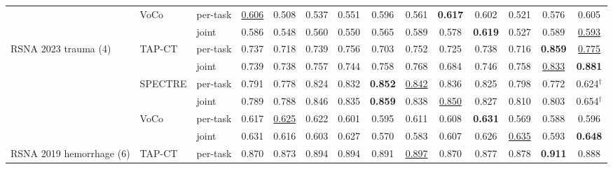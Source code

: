 \begin{tabular}{@{}lllccccccccccc@{}}
\addlinespace[1.5pt]
 & VoCo & per-task & \cellcolor{modebest}\underline{0.606} & 0.508 & 0.537 & \cellcolor{modebest}0.551 & \cellcolor{modebest}0.596 & 0.561 & \cellcolor{modebest}\textbf{0.617} & 0.602 & 0.521 & 0.576 & \cellcolor{modebest}0.605 \\
 &  & joint & 0.586 & \cellcolor{modebest}0.548 & \cellcolor{modebest}0.560 & 0.550 & 0.565 & \cellcolor{modebest}0.589 & 0.578 & \cellcolor{modebest}\textbf{0.619} & \cellcolor{modebest}0.527 & \cellcolor{modebest}0.589 & \underline{0.593} \\
\addlinespace
RSNA 2023 trauma (4) & TAP-CT & per-task & 0.737 & 0.718 & 0.739 & \cellcolor{modebest}0.756 & 0.703 & 0.752 & \cellcolor{modebest}0.725 & 0.738 & 0.716 & \cellcolor{modebest}\textbf{0.859} & \underline{0.775} \\
 &  & joint & \cellcolor{modebest}0.739 & \cellcolor{modebest}0.738 & \cellcolor{modebest}0.757 & 0.744 & \cellcolor{modebest}0.758 & \cellcolor{modebest}0.768 & 0.684 & \cellcolor{modebest}0.746 & \cellcolor{modebest}0.758 & \underline{0.833} & \cellcolor{modebest}\textbf{0.881} \\
\addlinespace[1.5pt]
 & SPECTRE & per-task & \cellcolor{modebest}0.791 & 0.778 & 0.824 & 0.832 & \textbf{0.852} & \cellcolor{modebest}\underline{0.842} & 0.836 & 0.825 & 0.798 & 0.772 & 0.624$^{\dagger}$ \\
 &  & joint & 0.789 & \cellcolor{modebest}0.788 & \cellcolor{modebest}0.846 & \cellcolor{modebest}0.835 & \cellcolor{modebest}\textbf{0.859} & 0.838 & \cellcolor{modebest}\underline{0.850} & \cellcolor{modebest}0.827 & \cellcolor{modebest}0.810 & \cellcolor{modebest}0.803 & 0.654$^{\dagger}$ \\
\addlinespace[1.5pt]
 & VoCo & per-task & 0.617 & \cellcolor{modebest}\underline{0.625} & \cellcolor{modebest}0.622 & 0.601 & \cellcolor{modebest}0.595 & \cellcolor{modebest}0.611 & \cellcolor{modebest}0.608 & \cellcolor{modebest}\textbf{0.631} & 0.569 & 0.588 & 0.596 \\
 &  & joint & \cellcolor{modebest}0.631 & 0.616 & 0.603 & \cellcolor{modebest}0.627 & 0.570 & 0.583 & 0.607 & 0.626 & \cellcolor{modebest}\underline{0.635} & \cellcolor{modebest}0.593 & \cellcolor{modebest}\textbf{0.648} \\
\addlinespace
RSNA 2019 hemorrhage (6) & TAP-CT & per-task & 0.870 & 0.873 & 0.894 & 0.894 & \cellcolor{modebest}0.891 & \underline{0.897} & \cellcolor{modebest}0.870 & \cellcolor{modebest}0.877 & \cellcolor{modebest}0.878 & \textbf{0.911} & \cellcolor{modebest}0.888 \\

\end{tabular}
